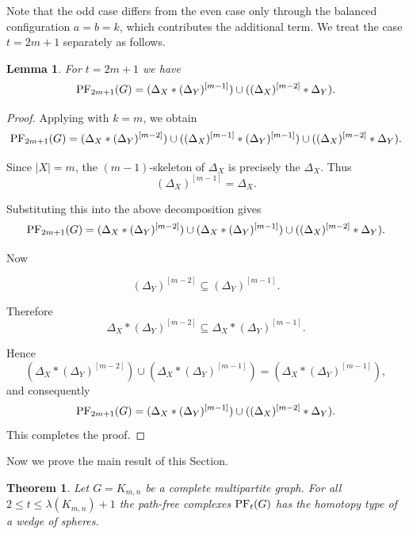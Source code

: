\documentclass[12pt,reqno]{amsart}
\newtheorem{lemma}[lemma]{Lemma}
\newtheorem{theorem}[theorem]{Theorem}
\theoremstyle{definition}
\newcommand{\PF}{{\rm PF}}
\begin{document}
Note that the odd case differs from the even case only through the balanced configuration $a=b=k$, which contributes the additional term. We treat the case $t=2m+1$ separately as follows. 

\begin{lemma}\label{lem: facets for t=2m+1}
For  $t=2m+1$ we have 
\[
\PF_{2m+1}(G)
=
(\Delta_X * (\Delta_{Y})^{[m-1]})
\cup
((\Delta_{X})^{[m-2]} * \Delta_Y).
\]
\end{lemma}

\begin{proof}
Applying  with $k=m$, we obtain
\[
\PF_{2m+1}(G)
=
(\Delta_X * (\Delta_Y)^{[m-2]})
\cup
((\Delta_X)^{[m-1]} * (\Delta_Y)^{[m-1]})
\cup
((\Delta_X)^{[m-2]} * \Delta_Y).
\]

Since $|X|=m$, the $(m-1)$-skeleton of $\Delta_X$ is precisely
the $\Delta_X$. Thus
\[
(\Delta_X)^{[m-1]}
=
\Delta_X.
\]

Substituting this into the above decomposition gives
\[
\PF_{2m+1}(G)
=
(\Delta_X * (\Delta_Y)^{[m-2]})
\cup
(\Delta_X * (\Delta_Y)^{[m-1]})
\cup
((\Delta_X)^{[m-2]} * \Delta_Y).
\]

Now

\[
(\Delta_Y)^{[m-2]}
\subseteq
(\Delta_Y)^{[m-1]}.
\]

Therefore
\[
\Delta_X * (\Delta_Y)^{[m-2]}
\subseteq
\Delta_X * (\Delta_Y)^{[m-1]}.
\]

Hence
\[
(\Delta_X * (\Delta_Y)^{[m-2]})
\cup
(\Delta_X * (\Delta_Y)^{[m-1]})
=
(\Delta_X * (\Delta_Y)^{[m-1]}),
\]
and consequently
\[
\PF_{2m+1}(G)
=
(\Delta_X * (\Delta_{Y})^{[m-1]})
\cup
((\Delta_{X})^{[m-2]} * \Delta_Y).
\]
This completes the proof.
\end{proof}

Now we prove the main result of this Section. 

\begin{theorem}\label{homotopy-decomposition-cbg}
Let $G = K_{m,n}$ be a complete multipartite graph. For all $2\leq t\leq \lambda(K_{m,n})+1$ the path-free complexes 
$\PF_t(G)$ has the homotopy type of a wedge of spheres. 
\end{theorem}
\end{document}
